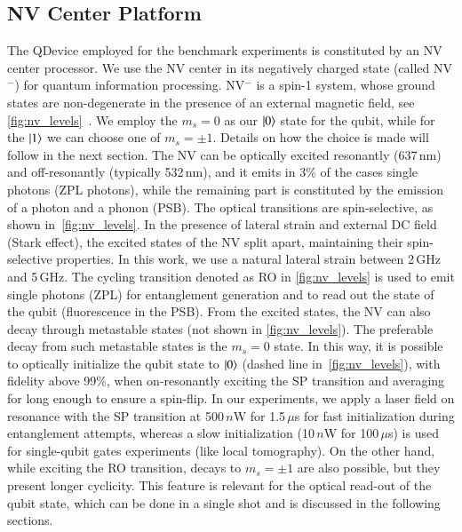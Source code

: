 \subsection{NV Center Platform}
\label{qnodeos:sec:qdevice-nv}

The \ac{QDevice} employed for the benchmark experiments is constituted by an \ac{NV} center processor. We use the \ac{NV} center in its negatively charged state (called \ac{NV}$^-$) for quantum information processing. \ac{NV}$^-$ is a spin-1 system, whose ground states are non-degenerate in the presence of an external magnetic field, see \cref{fig:nv_levels}~\cite{doherty_2013}. We employ the $m_s=0$ as our $\ket{0}$ state for the qubit, while for the $\ket{1}$ we can choose one of $m_s=\pm 1$. Details on how the choice is made will follow in the next section. The \ac{NV} can be optically excited resonantly (637\,nm) and off-resonantly (typically 532\,nm), and it emits in 3\% of the cases single photons (\ac{ZPL} photons), while the remaining part is constituted by the emission of a photon and a phonon (\ac{PSB}). The optical transitions are spin-selective, as shown in~\cref{fig:nv_levels}. In the presence of lateral strain and external DC field (Stark effect), the excited states of the \ac{NV} split apart, maintaining their spin-selective properties. In this work, we use a natural lateral strain between 2\,GHz and 5\,GHz. The cycling transition denoted as \ac{RO} in \cref{fig:nv_levels} is used to emit single photons (\ac{ZPL}) for entanglement generation and to read out the state of the qubit (fluorescence in the \ac{PSB}). From the excited states, the \ac{NV} can also decay through metastable states (not shown in \cref{fig:nv_levels}). The preferable decay from such metastable states is the $m_s=0$ state. In this way, it is possible to optically initialize the qubit state to $\ket{0}$ (dashed line in~\cref{fig:nv_levels}), with fidelity above 99\%, when on-resonantly exciting the \ac{SP} transition and averaging for long enough to ensure a spin-flip. In our experiments, we apply a laser field on resonance with the \ac{SP} transition at 500\,$n$W for 1.5\,$\mu$s for fast initialization during entanglement attempts, whereas a slow initialization (10\,$n$W for 100\,$\mu$s) is used for single-qubit gates experiments (like local tomography). On the other hand, while exciting the \ac{RO} transition, decays to $m_s=\pm 1$ are also possible, but they present longer cyclicity. This feature is relevant for the optical read-out of the qubit state, which can be done in a single shot and is discussed in the following sections.

